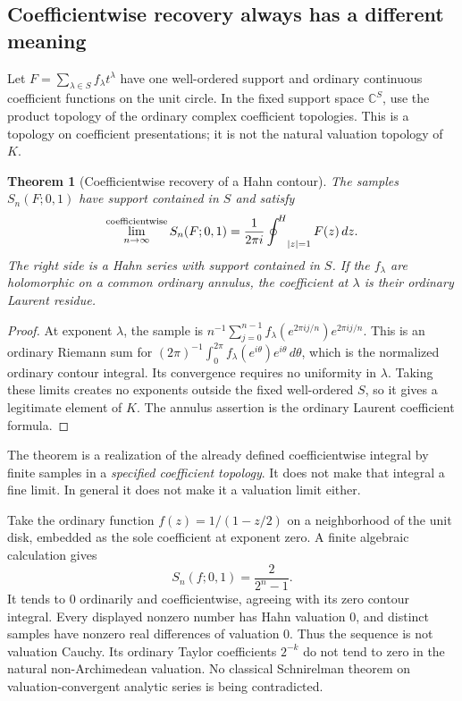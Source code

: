 \documentclass[11pt,letterpaper]{article}
\newtheorem{theorem}{Theorem}[section]
\theoremstyle{definition}
\theoremstyle{remark}
\newcommand{\C}{\mathbb C}\newcommand{\R}{\mathbb R}\newcommand{\Q}{\mathbb Q}\newcommand{\Z}{\mathbb Z}\newcommand{\N}{\mathbb N}
\numberwithin{equation}{section}
\begin{document}
\subsection{Coefficientwise recovery always has a different meaning}
Let $F=\sum_{\lambda\in S}f_\lambda t^\lambda$ have one well-ordered support and ordinary continuous coefficient functions on the unit circle. In the fixed support space $\C^S$, use the product topology of the ordinary complex coefficient topologies. This is a topology on coefficient presentations; it is not the natural valuation topology of $K$.

\begin{theorem}[Coefficientwise recovery of a Hahn contour]\label{thm:sampling}
The samples $S_n(F;0,1)$ have support contained in $S$ and satisfy
\begin{equation}\label{eq:coefflimit}
 \operatorname*{lim}_{n\to\infty}^{\mathrm{coefficientwise}}
       S_n(F;0,1)
 =\frac1{2\pi i}\mathop{\oint^{\!H}}\nolimits_{|z|=1}F(z)\,dz.
\end{equation}
The right side is a Hahn series with support contained in $S$. If the $f_\lambda$ are holomorphic on a common ordinary annulus, the coefficient at $\lambda$ is their ordinary Laurent residue.
\end{theorem}
\begin{proof}
At exponent $\lambda$, the sample is
$n^{-1}\sum_{j=0}^{n-1}f_\lambda(e^{2\pi ij/n})e^{2\pi ij/n}$.
This is an ordinary Riemann sum for
$(2\pi)^{-1}\int_0^{2\pi}f_\lambda(e^{i\theta})e^{i\theta}\,d\theta$,
which is the normalized ordinary contour integral. Its convergence requires no uniformity in $\lambda$. Taking these limits creates no exponents outside the fixed well-ordered $S$, so it gives a legitimate element of $K$. The annulus assertion is the ordinary Laurent coefficient formula.
\end{proof}

The theorem is a realization of the already defined coefficientwise integral by finite samples in a \emph{specified coefficient topology}. It does not make that integral a fine limit. In general it does not make it a valuation limit either.

\begin{example}\label{ex:ordinarysampling}
Take the ordinary function $f(z)=1/(1-z/2)$ on a neighborhood of the unit disk, embedded as the sole coefficient at exponent zero. A finite algebraic calculation gives
\begin{equation}\label{eq:ordinarysample}
 S_n(f;0,1)=\frac{2}{2^n-1}.
\end{equation}
It tends to $0$ ordinarily and coefficientwise, agreeing with its zero contour integral. Every displayed nonzero number has Hahn valuation $0$, and distinct samples have nonzero real differences of valuation $0$. Thus the sequence is not valuation Cauchy. Its ordinary Taylor coefficients $2^{-k}$ do not tend to zero in the natural non-Archimedean valuation. No classical Schnirelman theorem on valuation-convergent analytic series is being contradicted.
\end{example}
\end{document}
